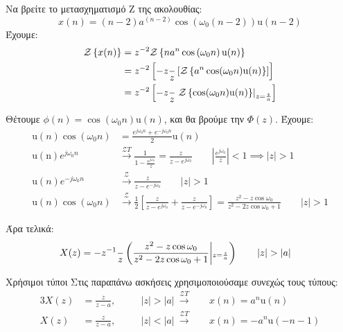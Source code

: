 \documentclass[11pt,a4paper,notitlepage,fleqn]{article}
\begin{document}
\begin{exercise}
	Να βρείτε το μετασχηματισμό Z της ακολουθίας:
	\[
	x(n) = (n-2)a^{(n-2)}\cos\left( \omega_0 (n-2) \right)
	\mathrm{u}(n-2)
	\]
	\tcblower
	Έχουμε:
	\begin{align*}
		\mathcal{Z}\left\lbrace x(n) \right\rbrace&= z^{-2}
		\mathcal{Z} \left\lbrace n a^n \cos\left(\omega_0 n\right) \mathrm{u}(n)\right\rbrace
		\\ &= z^{-2} \left[
		-z \frac{}{z} \left[ \mathcal{Z}
		  \left\lbrace a^n\cos(\omega_0 n)\mathrm{u}(n) \right\rbrace
		 \right]
		\right]
		\\ &= z^{-2}\left[
		  -z \frac{}{z}\left.\mathcal{Z}\left\lbrace \cos(\omega_0 n)\mathrm{u}(n) \right\rbrace\right|_{z=\frac{z}{a}}
		\right]
	\end{align*}
	
	Θέτουμε \( \phi(n) = \cos(\omega_0 n)\mathrm{u}(n) \), και θα βρούμε την \( \Phi(z) \). Έχουμε:
	\begin{align*}
		\mathrm{u}(n) \cos(\omega_0 n) &= \frac{e^{j\omega_0 n} + e^{-j\omega_0 n}}{2} \mathrm u(n)
		\\
		\mathrm{u(n)} e^{j\omega_0 n }&\xrightarrow{\mathcal{Z} T} \frac{1}{1-\frac{e^{j\omega_0}}{z}}
		= \frac{z}{z-e^{j\omega_0}} \qquad \left| \frac{e^{j\omega_0}}{z} \right| < 1 \implies |z|>1
		\\
		\mathrm{u}(n) e^{-j\omega_0 n}&\xrightarrow{\mathcal{Z}} \frac{z}{z-e^{-j\omega_0}} \qquad |z|>1
		\\
		\mathrm{u}(n) \cos(\omega_0 n)&\xrightarrow{\mathcal{Z}} \frac{1}{2}\left[
		\frac{z}{z-e^{j\omega_0}} + \frac{z}{z-e^{-j\omega_0}}
		\right]
		= \frac{z^2-z\cos\omega_0}{z^2-2z\cos\omega_0 + 1}\qquad |z|>1
	\end{align*}
	
	Άρα τελικά:
	\begin{align*}
		X(z) &= -z^{-1}\od{}{z} \left(
		\frac{z^2-z\cos\omega_0}{z^2-2z\cos\omega_0+1}\middle|_{z=\frac{z}{a}}
		\right)
		\qquad |z|>|a|
	\end{align*}
\end{exercise}


\begin{infobox}{Χρήσιμοι τύποι}
	Στις παραπάνω ασκήσεις χρησιμοποιούσαμε συνεχώς τους τύπους:
	\begin{alignat*}{3}
		X(z) &= \frac{z}{z-a}, &&\quad |z|>|a|\ \xrightarrow{\mathcal{Z}T}\ && x(n) = a^n\mathrm{u}(n)
		\\
		X(z) &= \frac{z}{z-a}, &&\quad |z|<|a|\ \xrightarrow{\mathcal{Z}T}\ && x(n) = -a^n\mathrm{u}(-n-1)
	\end{alignat*}
\end{infobox}
\end{document}

